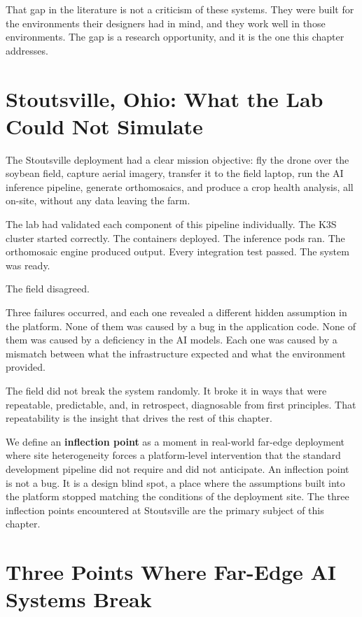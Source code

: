 That gap in the literature is not a criticism of these systems. They were built for the environments their designers had in mind, and they work well in those environments. The gap is a research opportunity, and it is the one this chapter addresses.

\section{Stoutsville, Ohio: What the Lab Could Not Simulate}
\label{sec:ch3_stoutsville}
The Stoutsville deployment had a clear mission objective: fly the drone over the soybean field, capture aerial imagery, transfer it to the field laptop, run the AI inference pipeline, generate orthomosaics, and produce a crop health analysis, all on-site, without any data leaving the farm.

The lab had validated each component of this pipeline individually. The K3S cluster started correctly. The containers deployed. The inference pods ran. The orthomosaic engine produced output. Every integration test passed. The system was ready.

The field disagreed.

Three failures occurred, and each one revealed a different hidden assumption in the platform. None of them was caused by a bug in the application code. None of them was caused by a deficiency in the AI models. Each one was caused by a mismatch between what the infrastructure expected and what the environment provided.

The field did not break the system randomly. It broke it in ways that were repeatable, predictable, and, in retrospect, diagnosable from first principles. That repeatability is the insight that drives the rest of this chapter.

We define an \textbf{inflection point} as a moment in real-world far-edge deployment where site heterogeneity forces a platform-level intervention that the standard development pipeline did not require and did not anticipate. An inflection point is not a bug. It is a design blind spot, a place where the assumptions built into the platform stopped matching the conditions of the deployment site. The three inflection points encountered at Stoutsville are the primary subject of this chapter.

\section{Three Points Where Far-Edge AI Systems Break}
\label{sec:ch3_inflection_points}

